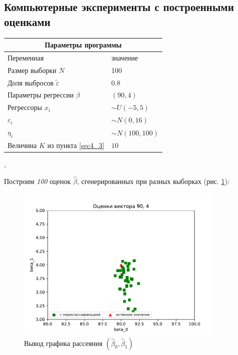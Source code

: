 \documentclass[a4paper,14pt]{extarticle}
\begin{document}
\subsection{Компьютерные эксперименты с построенными оценками}
\begin{center}
    \begin{tabular}{|p{5cm}|p{5cm}|}
        \hline
        \multicolumn{2}{|c|}{Параметры программы} \\
        \hline
        Переменная&значение\\
        \hline
        Размер выборки $N$& 100\\
        \hline
        Доля выбросов $\widetilde{\varepsilon}$& 0.8\\
        \hline
        Параметры регрессии $\beta$& $(90,4)$\\
        \hline
        Регрессоры $x_i$ & $\sim U(-5,5)$\\
        \hline
        $\varepsilon_i$&$\sim N(0,16)$\\
        \hline
        $\eta_i$&$\sim N(100,100)$\\
        \hline
        Величина $K$ из пункта \ref{sec4_3}&$10$\\
        \hline
    \end{tabular},
    \end{center}

Построим \textit{100} оценок $\hat{\beta}$, сгенерированных при разных выборках (рис. \ref{pic2}):

\newpage
\begin{figure}[ht!]
    \centering
    \includegraphics[width=100mm]{pics/plot_90_4_(3).pdf}
    \caption{Вывод графика рассеяния $(\hat{\beta}_0,\hat{\beta}_1)$\label{overflow}}
    \label{pic2}
\end{figure}
\hfill\break
\end{document}
